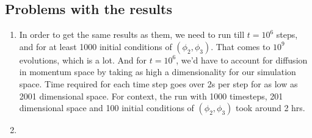 \documentclass[12pt]{article}
\begin{document}
\subsection{Problems with the results}
\begin{enumerate}
    \item In order to get the same results as them, we need to run till $t = 10^6$ steps,
    and for at least 1000 initial conditions of $(\phi_2, \phi_3)$. That comes to $10^9$ evolutions,
    which is a lot. And for $t = 10^6$, we'd have to account for diffusion in momentum space by
    taking as high a dimensionality for our simulation space. Time required for each time step goes
    over 2s per step for as low as 2001 dimensional space. For context, the run with 1000 timesteps,
    201 dimensional space and 100 initial conditions of $(\phi_2,\phi_3)$ took around 2 hrs.
    
    \item 
\end{enumerate}

\nocite{*}
\printbibliography
\end{document}
